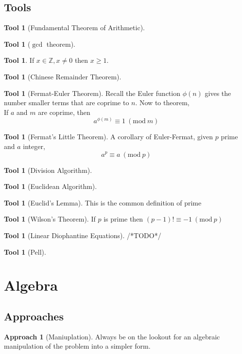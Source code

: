 \documentclass[12pt]{amsart}
\theoremstyle{definition}
\newtheorem{tool}[theorem]{Tool}
\newtheorem{approach}[theorem]{Approach}
\newcommand{\Mod}[1]{\ (\mathrm{mod}\ #1)}
\begin{document}
\subsection{Tools}
\begin{tool}[Fundamental Theorem of Arithmetic]\end{tool}
\begin{tool}[$\gcd$ theorem]\end{tool}
\begin{tool} If $x \in \mathbb{Z}, x \neq 0$ then $x \geq 1$. \end{tool}
\begin{tool}[Chinese Remainder Theorem]\end{tool}
\begin{tool}[Fermat-Euler Theorem]
    Recall the Euler function $\phi(n)$ gives the number smaller terms that
    are coprime to $n$. Now to theorem,\\
    If $a$ and $m$ are coprime, then
    \begin{equation*}
        a^{\phi(m)} \equiv 1\Mod m
    \end{equation*}
\end{tool}
\begin{tool}[Fermat's Little Theorem]
    A corollary of Euler-Fermat, given $p$ prime and $a$ integer,
    \begin{equation*}
        a^p \equiv a \Mod p
    \end{equation*}
\end{tool} 
\begin{tool}[Division Algorithm]\end{tool}
\begin{tool}[Euclidean Algorithm]\end{tool}
\begin{tool}[Euclid's Lemma] This is the common definition of prime\end{tool}
\begin{tool}[Wilson's Theorem]
    If $p$ is prime then $(p-1)! \equiv -1 \Mod p$ 
\end{tool}
\begin{tool}[Linear Diophantine Equations]/*TODO*/\end{tool}
\begin{tool}[Pell]\end{tool}
\section{Algebra}
\subsection{Approaches}
\begin{approach}[Maniuplation]
    Always be on the lookout for an algebraic manipulation of the problem
    into a simpler form.
\end{approach}
\end{document}
